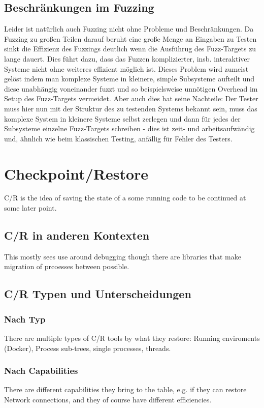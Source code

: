 \documentclass[12pt]{scrartcl}
\begin{document}
\subsection{Beschränkungen im Fuzzing}
Leider ist natürlich auch Fuzzing nicht ohne Probleme und Beschränkungen. Da Fuzzing zu großen Teilen darauf beruht eine große Menge an Eingaben zu Testen sinkt die Effizienz des Fuzzings deutlich wenn die Ausführug des Fuzz-Targets zu lange dauert. Dies führt dazu, dass das Fuzzen komplizierter, insb. interaktiver Systeme nicht ohne weiteres effizient möglich ist. Dieses Problem wird zumeist gelöst indem man komplexe Systeme in kleinere, simple Subsysteme aufteilt und diese unabhängig voneinander fuzzt und so beispielsweise unnötigen Overhead im Setup des Fuzz-Targets vermeidet. Aber auch dies hat seine Nachteile: Der Tester muss hier nun mit der Struktur des zu testenden Systems bekannt sein, muss das komplexe System in kleinere Systeme selbst zerlegen und dann für jedes der Subsysteme einzelne Fuzz-Targets schreiben - dies ist zeit- und arbeitsaufwändig und, ähnlich wie beim klassischen Testing, anfällig für Fehler des Testers. 

\section{Checkpoint/Restore}

C/R is the idea of saving the state of a some running code to be continued at some later point. 
\subsection{C/R in anderen Kontexten}
This mostly sees use around debugging though there are libraries that make migration of prcoesses between possible. 
\subsection{C/R Typen und Unterscheidungen}
\subsubsection{Nach Typ}
There are multiple types of C/R tools by what they restore: Running enviroments (Docker), Process sub-trees, single processes, threads. 
\subsubsection{Nach Capabilities}
There are different capabilities they bring to the table, e.g. if they can restore Network connections, and they of course have different efficiencies.
\end{document}
